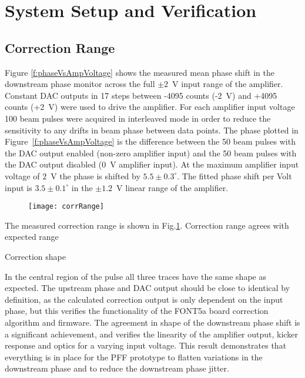 \section{\label{s:verify}System Setup and Verification}

\subsection{\label{ss:corrRange}Correction Range}

Figure \ref{f:phaseVsAmpVoltage} shows the measured mean phase shift in the 
downstream phase monitor across the full \(\pm2\)~V input range of the 
amplifier. Constant DAC outputs in 17 steps between -4095 counts (-2~V) and 
+4095 counts (+2~V) were used to drive the amplifier. For each amplifier input 
voltage 100 beam pulses were acquired in interleaved mode in order to reduce 
the sensitivity to any drifts in beam phase between data points. The phase 
plotted in Figure~\ref{f:phaseVsAmpVoltage} is the difference between the 50 
beam pulses with the DAC output enabled (non-zero amplifier input) and the 50 
beam pulses with the DAC output disabled (0~V amplifier input).
At the maximum amplifier input voltage of \(2\)~V the phase is shifted by 
\(5.5\pm0.3^\circ\). The fitted phase shift per Volt input is 
\(3.5\pm0.1^\circ\) in the \(\pm1.2\)~V linear range of the amplifier.

\begin{figure}
  \texttt{[image: corrRange]} 
  \caption{\label{f:corrRange}
  }
\end{figure}

The measured correction range is shown in Fig.\ref{f:corrRange}.
Correction range agrees with expected range

Correction shape

In the central region of the pulse all three traces have the same shape as 
expected. The upstream phase and DAC output should be close to identical by 
definition, as the calculated correction output is only dependent on the input 
phase, but this verifies the functionality of the FONT5a board correction 
algorithm and firmware. The agreement in shape of the downstream phase shift is 
a significant achievement, and verifies the linearity of the amplifier output, 
kicker response and optics for a varying input voltage. This result 
demonstrates that everything is in place for the PFF prototype to flatten 
variations in the downstream phase and to reduce the downstream phase jitter.

